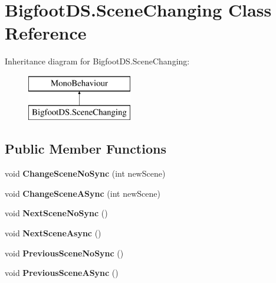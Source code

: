 \hypertarget{class_bigfoot_d_s_1_1_scene_changing}{}\section{Bigfoot\+D\+S.\+Scene\+Changing Class Reference}
\label{class_bigfoot_d_s_1_1_scene_changing}
Inheritance diagram for Bigfoot\+D\+S.\+Scene\+Changing\+:\begin{figure}[H]
\begin{center}
\leavevmode
\includegraphics[height=2.000000cm]{class_bigfoot_d_s_1_1_scene_changing}
\end{center}
\end{figure}
\subsection*{Public Member Functions}
\begin{DoxyCompactItemize}
\item 
\mbox{\label{class_bigfoot_d_s_1_1_scene_changing_a76bbba565a3d8b47978ce8df6a3fa982}} 
void {\bfseries Change\+Scene\+No\+Sync} (int new\+Scene)
\item 
\mbox{\label{class_bigfoot_d_s_1_1_scene_changing_a427180761a5ad002945c369f9120bfe9}} 
void {\bfseries Change\+Scene\+A\+Sync} (int new\+Scene)
\item 
\mbox{\label{class_bigfoot_d_s_1_1_scene_changing_a080d3784c25b537678b4962366f98413}} 
void {\bfseries Next\+Scene\+No\+Sync} ()
\item 
\mbox{\label{class_bigfoot_d_s_1_1_scene_changing_aec2e28e7f6ed45acbf39ebca6612f901}} 
void {\bfseries Next\+Scene\+Async} ()
\item 
\mbox{\label{class_bigfoot_d_s_1_1_scene_changing_a033c3a7a65174ef02075498d5e45ad7f}} 
void {\bfseries Previous\+Scene\+No\+Sync} ()
\item 
\mbox{\label{class_bigfoot_d_s_1_1_scene_changing_a9f7e38dd6c634f1243aeccfe49710ba2}} 
void {\bfseries Previous\+Scene\+A\+Sync} ()
\end{DoxyCompactItemize}
